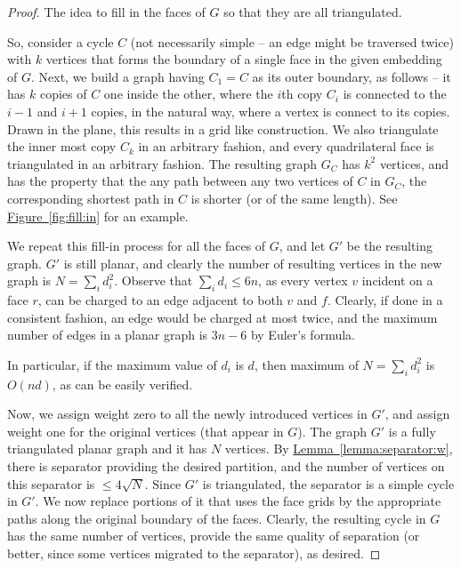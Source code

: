 \documentclass[12pt]{article}
\theoremstyle{remark}\theoremheaderfont{\sf}\theorembodyfont{\upshape}\newtheorem{defn}[theorem]{Definition}
\newcommand{\HLink}[2]{\hyperref[#2]{#1~\ref*{#2}}}
\newcommand{\lemref}[1]{\HLink{Lemma}{lemma:#1}}
\newcommand{\figlab}[1]{\label{fig:#1}}
\newcommand{\figref}[1]{\HLink{Figure}{fig:#1}}
\renewcommand{\th}{th\xspace}
\newcommand{\Graph}{{G}}
\begin{document}
\begin{proof}
    The idea to fill in the faces of $\Graph$ so that they are all
    triangulated.

    So, consider a cycle $C$ (not necessarily simple -- an edge might
    be traversed twice) with $k$ vertices that forms the boundary of a
    single face in the given embedding of $\Graph$. Next, we build a
    graph having $C_1= C$ as its outer boundary, as follows -- it has
    $k$ copies of $C$ one inside the other, where the $i$\th copy
    $C_i$ is connected to the $i-1$ and $i+1$ copies, in the natural
    way, where a vertex is connect to its copies. Drawn in the plane,
    this results in a grid like construction.  We also triangulate the
    inner most copy $C_k$ in an arbitrary fashion, and every
    quadrilateral face is triangulated in an arbitrary fashion. The
    resulting graph $\Graph_C$ has $k^2$ vertices, and has the
    property that the any path between any two vertices of $C$ in
    $\Graph_C$, the corresponding shortest path in $C$ is shorter (or
    of the same length). See \figref{fill:in} for an example.

    \parpic[r]{\begin{minipage}{5cm}
           \texttt{[image: figs/grid\_face]}
           \captionof{figure}{}
           \figlab{fill:in}
       \end{minipage}}

    We repeat this fill-in process for all the faces of $\Graph$, and
    let $\Graph'$ be the resulting graph. $\Graph'$ is still planar,
    and clearly the number of resulting vertices in the new graph is
    $N= \sum_{i} d_i^2$. Observe that $\sum_i d_i \leq 6n$, as every
    vertex $v$ incident on a face $r$, can be charged to an edge
    adjacent to both $v$ and $f$. Clearly, if done in a consistent
    fashion, an edge would be charged at most twice, and the maximum
    number of edges in a planar graph is $3n -6$ by Euler's formula.

    In particular, if the maximum value of $d_i$ is $d$, then maximum
    of $N = \sum_i d_i^2$ is $O(nd)$, as can be easily verified.

    Now, we assign weight zero to all the newly introduced vertices in
    $\Graph'$, and assign weight one for the original vertices (that
    appear in $\Graph$). The graph $\Graph'$ is a fully triangulated
    planar graph and it has $N$ vertices.  By \lemref{separator:w},
    there is separator providing the desired partition, and the number
    of vertices on this separator is $\leq 4 \sqrt{N}$. Since
    $\Graph'$ is triangulated, the separator is a simple cycle in
    $\Graph'$. We now replace portions of it that uses the face grids
    by the appropriate paths along the original boundary of the
    faces. Clearly, the resulting cycle in $\Graph$ has the same
    number of vertices, provide the same quality of separation (or
    better, since some vertices migrated to the separator), as
    desired.
\end{proof}
\end{document}
